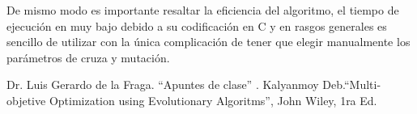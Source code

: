 \documentclass[conference]{IEEEtran}
\begin{document}
De mismo modo es importante resaltar la eficiencia del algoritmo, el tiempo de ejecución en muy bajo debido a su codificación en C y en rasgos generales es sencillo de utilizar con la única complicación de tener que elegir manualmente los parámetros de cruza y mutación.


\begin{thebibliography}{00}
  Dr. Luis Gerardo de la Fraga. ``Apuntes de clase'' .
 Kalyanmoy Deb.``Multi-objetive Optimization using Evolutionary Algoritms'', John Wiley, 1ra Ed.
\end{thebibliography}
\end{document}

